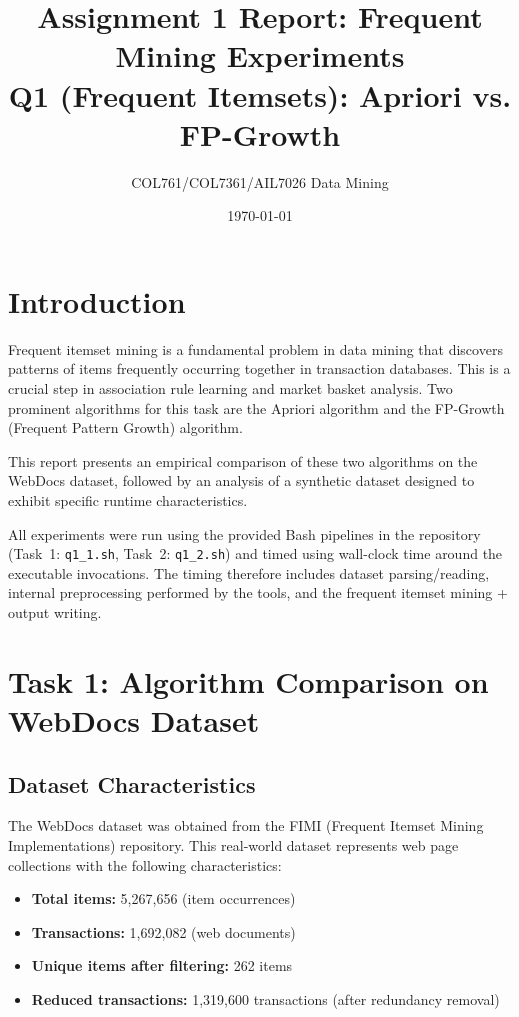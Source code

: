 \documentclass[11pt]{article}
\title{Assignment 1 Report: Frequent Mining Experiments\\
Q1 (Frequent Itemsets): Apriori vs. FP-Growth}
\author{COL761/COL7361/AIL7026 Data Mining}
\date{\today}
\begin{document}
\maketitle

\section{Introduction}

Frequent itemset mining is a fundamental problem in data mining that discovers patterns of items frequently occurring together in transaction databases. This is a crucial step in association rule learning and market basket analysis. Two prominent algorithms for this task are the Apriori algorithm and the FP-Growth (Frequent Pattern Growth) algorithm. 

This report presents an empirical comparison of these two algorithms on the WebDocs dataset, followed by an analysis of a synthetic dataset designed to exhibit specific runtime characteristics.

All experiments were run using the provided Bash pipelines in the repository (Task~1: \texttt{q1\_1.sh}, Task~2: \texttt{q1\_2.sh}) and timed using wall-clock time around the executable invocations. The timing therefore includes dataset parsing/reading, internal preprocessing performed by the tools, and the frequent itemset mining + output writing.

\section{Task 1: Algorithm Comparison on WebDocs Dataset}

\subsection{Dataset Characteristics}

The WebDocs dataset was obtained from the FIMI (Frequent Itemset Mining Implementations) repository. This real-world dataset represents web page collections with the following characteristics:

\begin{itemize}
    \item \textbf{Total items:} 5,267,656 (item occurrences)
    \item \textbf{Transactions:} 1,692,082 (web documents)
    \item \textbf{Unique items after filtering:} 262 items
    \item \textbf{Reduced transactions:} 1,319,600 transactions (after redundancy removal)
\end{itemize}
\end{document}
